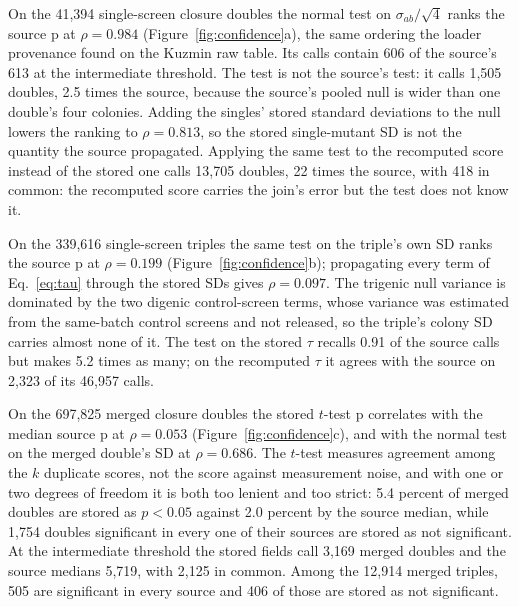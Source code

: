 \begin{table}[htbp]
\centering
\footnotesize
\caption{Stored against recomputed p-values, by stratum. $\rho$ is Spearman's
correlation between the two p-values; the last two columns are the fraction of the
stratum called an interaction at $|\text{score}| > 0.08$ and $p < 0.05$ under the
stored fields and under the comparison. Generated by
\texttt{s3\_closure\_recompute.py}.}
\label{tab:confidence}

\end{table}

On the 41{,}394 single-screen closure doubles the normal test on
$\sigma_{ab}/\sqrt{4}$ ranks the source p at $\rho = 0.984$
(Figure~\ref{fig:confidence}a), the same ordering the loader provenance found on the
Kuzmin raw table. Its calls contain 606 of the source's 613 at the intermediate
threshold. The test is not the source's test: it calls 1{,}505 doubles, 2.5 times the
source, because the source's pooled null is wider than one double's four colonies.
Adding the singles' stored standard deviations to the null lowers the ranking to
$\rho = 0.813$, so the stored single-mutant SD is not the quantity the source
propagated. Applying the same test to the recomputed score instead of the stored one
calls 13{,}705 doubles, 22 times the source, with 418 in common: the recomputed score
carries the join's error but the test does not know it.

On the 339{,}616 single-screen triples the same test on the triple's own SD ranks the
source p at $\rho = 0.199$ (Figure~\ref{fig:confidence}b); propagating every term of
Eq.~\ref{eq:tau} through the stored SDs gives $\rho = 0.097$. The trigenic null
variance is dominated by the two digenic control-screen terms, whose variance was
estimated from the same-batch control screens and not released, so the triple's
colony SD carries almost none of it. The test on the stored $\tau$ recalls 0.91 of the
source calls but makes 5.2 times as many; on the recomputed $\tau$ it agrees with the
source on 2{,}323 of its 46{,}957 calls.

On the 697{,}825 merged closure doubles the stored $t$-test p correlates with the
median source p at $\rho = 0.053$ (Figure~\ref{fig:confidence}c), and with the normal
test on the merged double's SD at $\rho = 0.686$. The $t$-test measures agreement
among the $k$ duplicate scores, not the score against measurement noise, and with one
or two degrees of freedom it is both too lenient and too strict: 5.4 percent of merged
doubles are stored as $p < 0.05$ against 2.0 percent by the source median, while
1{,}754 doubles significant in every one of their sources are stored as not
significant. At the intermediate threshold the stored fields call 3{,}169 merged
doubles and the source medians 5{,}719, with 2{,}125 in common. Among the 12{,}914
merged triples, 505 are significant in every source and 406 of those are stored as
not significant.
